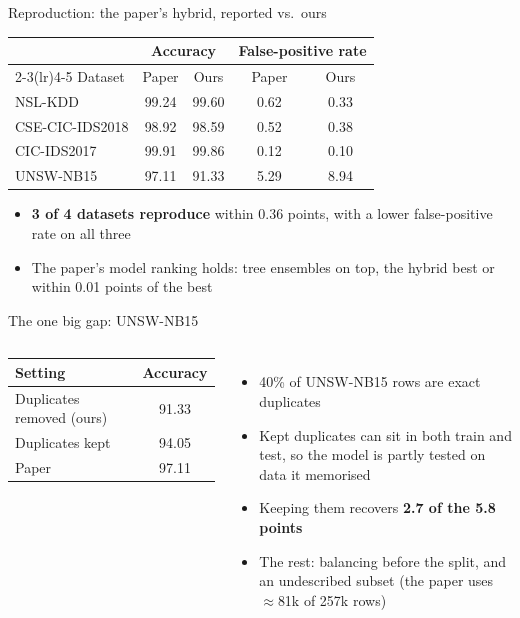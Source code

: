 \documentclass[aspectratio=169,11pt]{beamer}
\begin{document}
\begin{frame}{Reproduction: the paper's hybrid, reported vs.\ ours}
\centering
\begin{tabular}{lcccc}
\toprule
& \multicolumn{2}{c}{Accuracy} & \multicolumn{2}{c}{False-positive rate} \\
\cmidrule(lr){2-3}\cmidrule(lr){4-5}
Dataset & Paper & Ours & Paper & Ours \\
\midrule
NSL-KDD         & 99.24 & 99.60 & 0.62 & \textcolor{good}{0.33} \\
CSE-CIC-IDS2018 & 98.92 & 98.59 & 0.52 & \textcolor{good}{0.38} \\
CIC-IDS2017     & 99.91 & 99.86 & 0.12 & \textcolor{good}{0.10} \\
UNSW-NB15       & 97.11 & \alert{91.33} & 5.29 & \alert{8.94} \\
\bottomrule
\end{tabular}
\vspace{6mm}
\begin{itemize}\small
  \item \textbf{3 of 4 datasets reproduce} within 0.36 points, with a lower false-positive rate on all three
  \item The paper's model ranking holds: tree ensembles on top, the hybrid best or within 0.01 points of the best
\end{itemize}
\end{frame}

\begin{frame}{The one big gap: UNSW-NB15}
\begin{columns}[c]
\centering
\begin{tabular}{lc}
\toprule
Setting & Accuracy \\
\midrule
Duplicates removed (ours) & 91.33 \\
Duplicates kept           & 94.05 \\
Paper                     & 97.11 \\
\bottomrule
\end{tabular}
\begin{itemize}\small
  \item 40\% of UNSW-NB15 rows are exact duplicates
  \item Kept duplicates can sit in both train and test, so the model is partly tested on data it memorised
  \item Keeping them recovers \textbf{2.7 of the 5.8 points}
  \item The rest: balancing before the split, and an undescribed subset (the paper uses $\approx$81k of 257k rows)
\end{itemize}
\end{columns}
\end{frame}
\end{document}
